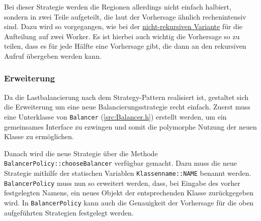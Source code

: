 Bei dieser Strategie werden die Regionen allerdings nicht einfach halbiert, sondern in zwei Teile aufgeteilt, die laut der Vorhersage ähnlich rechenintensiv sind.
Dazu wird so vorgegangen, wie bei der \hyperref[lastbalancierung_vorhersage]{nicht-rekursiven Variante} für die Aufteilung auf zwei Worker.
Es ist hierbei auch wichtig die Vorhersage so zu teilen, dass es für jede Hälfte eine Vorhersage gibt, die dann an den rekursiven Aufruf übergeben werden kann.

\subsubsection{Erweiterung}\label{lastbalancierung_erweiterung}

Da die Lastbalancierung nach dem Strategy-Pattern realisiert ist, gestaltet sich die Erweiterung um eine neue Balancierungsstrategie recht einfach.
Zuerst muss eine Unterklasse von \verb|Balancer| (\autoref{src:Balancer.h}) erstellt werden, um ein gemeinsames Interface zu ezwingen und somit die polymorphe Nutzung der neuen Klasse zu ermöglichen.

\begin{figure}
	
\end{figure}

Danach wird die neue Strategie über die Methode \verb|BalancerPolicy::chooseBalancer| verfügbar gemacht.
Dazu muss die neue Strategie mithilfe der statischen Variablen \verb|Klassenname::NAME| benannt werden.
\verb|BalancerPolicy| muss nun so erweitert werden, dass, bei Eingabe des vorher festgelegten Namens, ein neues Objekt der entsprechenden Klasse zurückgegeben wird.
In \verb|BalancerPolicy| kann auch die Genauigkeit der Vorhersage für die oben aufgeführten Strategien festgelegt werden.

